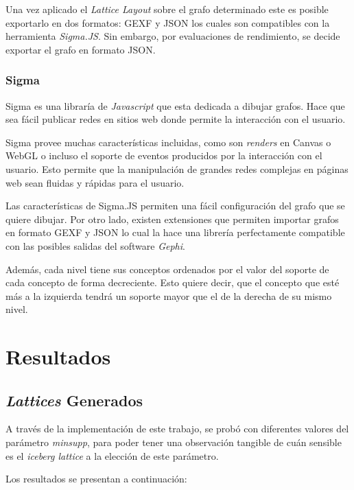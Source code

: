 \documentclass[12pt,oneside,letterpaper]{book}
\newcommand{\eng}[1]{\textit{#1}\xspace}			%
\newcommand{\abr}[1]{\textsc{#1}\xspace}           %
\theoremstyle{definition}
\begin{document}
Una vez aplicado el \eng{Lattice Layout} sobre el grafo determinado este es posible exportarlo en dos formatos: \abr{GEXF} y \abr{JSON} los cuales son compatibles con la herramienta \eng{Sigma.JS}. Sin embargo, por evaluaciones de rendimiento, se decide exportar el grafo en formato \abr{JSON}.

\subsection{Sigma}
\label{sub:exporter_to_sigma}
Sigma es una libraría de \eng{Javascript} que esta dedicada a dibujar grafos. Hace que sea fácil publicar redes en sitios web donde permite la interacción con el usuario.

Sigma provee muchas características incluidas, como son \eng{renders} en Canvas o WebGL o incluso el soporte de eventos producidos por la interacción con el usuario. Esto permite que la manipulación de grandes redes complejas en páginas web sean fluidas y rápidas para el usuario.

Las características de Sigma.JS permiten una fácil configuración del grafo que se quiere dibujar. Por otro lado, existen extensiones que permiten importar grafos en formato \abr{GEXF} y \abr{JSON} lo cual la hace una librería perfectamente compatible con las posibles salidas del software \eng{Gephi}.

Además, cada nivel tiene sus conceptos ordenados por el valor del soporte de cada concepto de forma decreciente. Esto quiere decir, que el concepto que esté más a la izquierda tendrá un soporte mayor que el de la derecha de su mismo nivel.


\chapter{Resultados}
\label{chap:results}
\section{\eng{Lattices} Generados}
A través de la implementación de este trabajo, se probó con diferentes valores del parámetro \eng{minsupp}, para poder tener una observación tangible de cuán sensible es el \eng{iceberg lattice} a la elección de este parámetro.

Los resultados se presentan a continuación:
\end{document}
